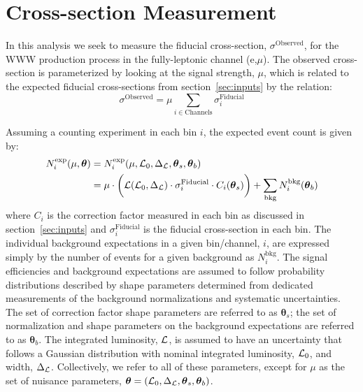 

\section{Cross-section Measurement}
\label{sec:measurement}
\newcommand*\Diff[1]{\mathop{}\!\mathrm{d}#1~}
\newcommand{\boldtheta}{\boldsymbol{\theta}}
\newcommand{\thetas}{\boldsymbol{\theta}_s}
\newcommand{\thetab}{\boldsymbol{\theta}_b}

In this analysis we seek to measure the 
fiducial cross-section, $\sigma^{\textrm{Observed}}$, for the 
WWW production process in the fully-leptonic channel (e,$\mu$).
The observed cross-section is parameterized by looking at the signal
strength, $\mu$, which is related to the expected fiducial cross-sections
from section~\ref{sec:inputs} by the relation:
\begin{equation}
\sigma^{\textrm{Observed}} = \mu \sum_{i\in \textrm{Channels}} \sigma^{\textrm{Fiducial}}_i
\end{equation}

Assuming a counting experiment in each bin $i$, the expected 
event count is given by:
\begin{align}
N^{\mathrm{exp}}_i(\mu,\boldtheta) &= N^{\mathrm{exp}}_i(\mu,\curlyl_0,\Delta_{\curlyl},\thetas,\thetab) \\
 &= \mu \cdot \bigg( \curlyl(\curlyl_0,\Delta_{\curlyl}) \cdot \sigma^{\mathrm{Fiducial}}_i \cdot C_i(\thetas) \bigg) + \sum_{\mathrm{bkg}} N_{i}^{\mathrm{bkg}}(\thetab)
\label{eq:poisson_expectation}
\end{align}
where $C_i$ is the correction factor 
measured in each bin as discussed in section~\ref{sec:inputs} and 
$\sigma^{\mathrm{Fiducial}}_i$ is the fiducial cross-section in each 
bin. The 
individual background expectations in a given bin/channel, $i$, are 
expressed simply by the number of events
for a given background as $N^{\mathrm{bkg}}_i$. 
The signal efficiencies and background expectations are assumed to follow 
probability distributions described by shape parameters determined from 
dedicated measurements of the background normalizations and systematic 
uncertainties.  
The set of correction factor shape parameters are referred to 
as $\thetas$; the set of normalization and shape parameters on 
the background expectations are referred to as $\thetab$.
The integrated luminosity, $\mathcal{L}$, is assumed to have an uncertainty
that follows 
a Gaussian distribution with nominal integrated 
luminosity, $\mathcal{L}_0$, and width, $\Delta_{\mathcal{L}}$. 
Collectively, we refer to all of these parameters, except 
for $\mu$ as the set of nuisance 
parameters, $\boldtheta = (\curlyl_0,\Delta_{\curlyl}, \thetas, \thetab)$. 

